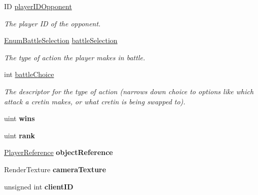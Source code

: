 \begin{DoxyCompactItemize}
\item 
I\-D \hyperlink{struct_game_state_1_1_player_aaed188c94b7f6be4dabe39744aa818ca}{player\-I\-D\-Opponent}
\begin{DoxyCompactList}\small\item\em The player I\-D of the opponent. \end{DoxyCompactList}\item 
\hyperlink{struct_game_state_1_1_player_a9f54c5eca1e60acbaa2074e981f51615}{Enum\-Battle\-Selection} \hyperlink{struct_game_state_1_1_player_a123c8ee2ef6e66e88bcca1a80f73ab4a}{battle\-Selection}
\begin{DoxyCompactList}\small\item\em The type of action the player makes in battle. \end{DoxyCompactList}\item 
int \hyperlink{struct_game_state_1_1_player_a3bfa8ea6e2067982474dc4f6073061c5}{battle\-Choice}
\begin{DoxyCompactList}\small\item\em The descriptor for the type of action (narrows down choice to options like which attack a cretin makes, or what cretin is being swapped to). \end{DoxyCompactList}\item 
\hypertarget{struct_game_state_1_1_player_a3a4d13459cad9bd58e058ddc6387af70}{uint {\bfseries wins}}\label{struct_game_state_1_1_player_a3a4d13459cad9bd58e058ddc6387af70}

\item 
\hypertarget{struct_game_state_1_1_player_a6cf0778cc27a824eac211b8b29b3dfcc}{uint {\bfseries rank}}\label{struct_game_state_1_1_player_a6cf0778cc27a824eac211b8b29b3dfcc}

\item 
\hypertarget{struct_game_state_1_1_player_aebf24de01e14055dc940d0493753484f}{\hyperlink{class_player_reference}{Player\-Reference} {\bfseries object\-Reference}}\label{struct_game_state_1_1_player_aebf24de01e14055dc940d0493753484f}

\item 
\hypertarget{struct_game_state_1_1_player_ac1f7e0b5bc335c32c3be71e3653787a6}{Render\-Texture {\bfseries camera\-Texture}}\label{struct_game_state_1_1_player_ac1f7e0b5bc335c32c3be71e3653787a6}

\item 
\hypertarget{struct_game_state_1_1_player_a1bef4cd92306bd5cf330c4756e63686c}{unsigned int {\bfseries client\-I\-D}}\label{struct_game_state_1_1_player_a1bef4cd92306bd5cf330c4756e63686c}


\end{DoxyCompactItemize}
